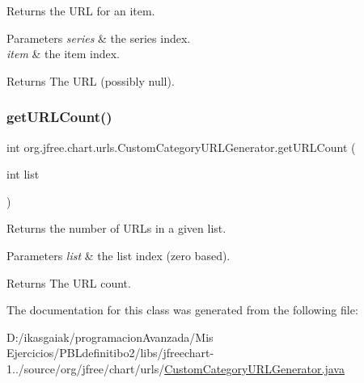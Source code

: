 Returns the U\+RL for an item.


\begin{DoxyParams}{Parameters}
{\em series} & the series index. \\
\hline
{\em item} & the item index.\\
\hline
\end{DoxyParams}
\begin{DoxyReturn}{Returns}
The U\+RL (possibly {\ttfamily null}). 
\end{DoxyReturn}
\mbox{\label{classorg_1_1jfree_1_1chart_1_1urls_1_1_custom_category_u_r_l_generator_a0e56c90081c2ef768edcbb8576922ab2}} 
\subsubsection{\texorpdfstring{get\+U\+R\+L\+Count()}{getURLCount()}}
{\footnotesize\ttfamily int org.\+jfree.\+chart.\+urls.\+Custom\+Category\+U\+R\+L\+Generator.\+get\+U\+R\+L\+Count (\begin{DoxyParamCaption}\item[{int}]{list }\end{DoxyParamCaption})}

Returns the number of U\+R\+Ls in a given list.


\begin{DoxyParams}{Parameters}
{\em list} & the list index (zero based).\\
\hline
\end{DoxyParams}
\begin{DoxyReturn}{Returns}
The U\+RL count. 
\end{DoxyReturn}


The documentation for this class was generated from the following file\+:\begin{DoxyCompactItemize}
\item 
D\+:/ikasgaiak/programacion\+Avanzada/\+Mis Ejercicios/\+P\+B\+Ldefinitibo2/libs/jfreechart-\/1../source/org/jfree/chart/urls/\mbox{\hyperlink{_custom_category_u_r_l_generator_8java}{Custom\+Category\+U\+R\+L\+Generator.\+java}}\end{DoxyCompactItemize}
